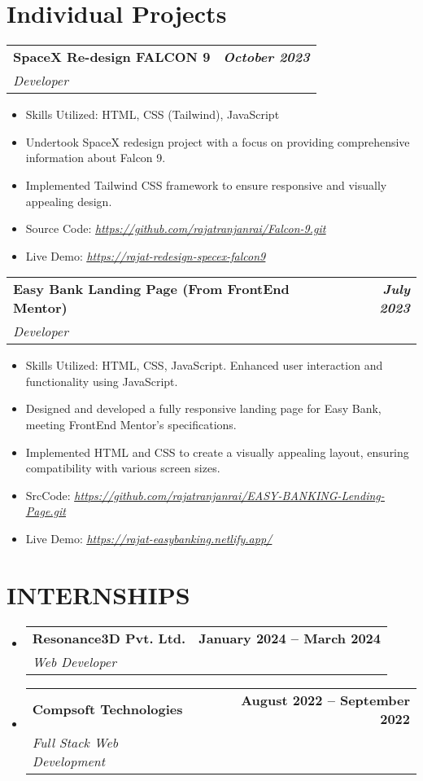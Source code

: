 \documentclass[letterpaper,11pt]{article}
\makeatletter
\newcommand{\resumeItem}[1]{
  \item\small{
    {#1 \vspace{-2pt}}
  }
}
\newcommand{\resumeSubheading}[4]{
  \vspace{-2pt}\item
    \begin{tabular*}{1.0\textwidth}[t]{l@{\extracolsep{\fill}}r}
      \textbf{#1} & \textbf{\small #2} \\
      \textit{\small#3} & \textit{\small #4} \\
    \end{tabular*}\vspace{-7pt}
}
\newcommand{\resumeSubHeadingListStart}{\begin{itemize}[leftmargin=0.0in, label={}]}
\newcommand{\resumeSubHeadingListEnd}{\end{itemize}}
\newcommand{\resumeItemListStart}{\begin{itemize}}
\newcommand{\resumeItemListEnd}{\end{itemize}\vspace{-5pt}}
\makeatother
\begin{document}
\section{Individual Projects}
    \vspace{5pt}
    \resumeSubheading
          {SpaceX Re-design  FALCON 9}{\textit{October 2023}}
          {Developer}{}
          \resumeItemListStart
            \resumeItem{Skills Utilized: HTML, CSS (Tailwind), JavaScript}
            \resumeItem{Undertook SpaceX redesign project with a focus on providing comprehensive information about Falcon 9.}
            \resumeItem{Implemented Tailwind CSS framework to ensure responsive and visually appealing design.}
            \resumeItem{Source Code: \href{https://github.com/rajatranjanrai/Falcon-9.git}{\textit{\underline{https://github.com/rajatranjanrai/Falcon-9.git}}}}
            \resumeItem{Live Demo: \href{https://rajatranjan-falcon-9.netlify.app}
            {\textit{\underline{https://rajat-redesign-specex-falcon9}}}}
          \resumeItemListEnd
    \vspace{5pt}


    \resumeSubheading
{Easy Bank Landing Page (From FrontEnd Mentor)}{\textit{July 2023}}
{Developer}{}
\resumeItemListStart
    \resumeItem{Skills Utilized: HTML, CSS, JavaScript. Enhanced user interaction and functionality using JavaScript.}
    \resumeItem{Designed and developed a fully responsive landing page for Easy Bank, meeting FrontEnd Mentor's specifications.}
    \resumeItem{Implemented HTML and CSS to create a visually appealing layout, ensuring compatibility with various screen sizes.}
    \resumeItem{SrcCode: \href{https://github.com/rajatranjanrai/EASY-BANKING-Lending-Page.git}{\textit{\underline{https://github.com/rajatranjanrai/EASY-BANKING-Lending-Page.git}}}}
    \resumeItem{Live Demo: \href{https://rajat-easybanking.netlify.app/}{\textit{\underline{https://rajat-easybanking.netlify.app/}}}}
\resumeItemListEnd

\vspace{5pt}



\section{INTERNSHIPS}
  \resumeSubHeadingListStart
    \resumeSubheading
      {Resonance3D Pvt. Ltd.}{January 2024 -- March 2024}
      {Web Developer}{}
    \resumeSubheading
      {Compsoft Technologies}{August 2022 -- September 2022}
      {Full Stack Web Development}{}
  \resumeSubHeadingListEnd
\end{document}
